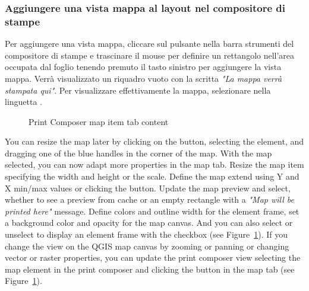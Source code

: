 \subsubsection{Aggiungere una vista mappa al layout nel compositore di
stampe}

Per aggiungere una vista mappa, cliccare sul pulsante
 nella barra strumenti
del compositore di stampe e trascinare il mouse per definire un rettangolo
nell'area occupata dal foglio tenendo premuto il tasto sinistro per aggiungere
la vista mappa. Verrà visualizzato un riquadro vuoto con la scritta
\textit{"La mappa verrà stampata qui"}. Per visualizzare effettivamente la mappa,
selezionare  nella linguetta .

\begin{figure}[ht]
\centering
\caption{Print Composer map item tab content \nixcaption}\label{fig:print_composer_map_item}
   \goodgap
\end{figure}

You can resize the map later by clicking on the  
button, selecting the element, and dragging one of the blue handles in the corner of the map. With the 
map selected, you can now adapt more properties in the map  tab. Resize the map 
item specifying the width and height or the scale. Define the map extend using Y and 
X min/max values or clicking the  button. Update the 
map preview and select, whether to see a preview from cache or an empty rectangle with 
a \textit{"Map will be printed here"} message. Define colors and outline width for the 
element frame, set a background color and opacity for the map canvas. And you can also 
select or unselect to display an element frame with the  checkbox 
(see Figure~\ref{fig:print_composer_map_item}). If you change the view on the QGIS 
map canvas by zooming or panning or changing vector or raster properties, you can 
update the print composer view selecting the map element in the print composer and clicking 
the  button in the map  tab 
(see Figure~\ref{fig:print_composer_map_item}). 

